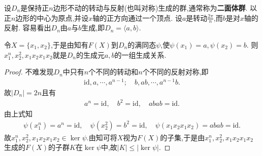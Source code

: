 \documentclass[../../main.tex]{subfiles}%
\begin{document}
\begin{proposition}
设$D_n$是保持正$n$边形不动的转动与反射(也叫对称)生成的群,通常称为\textbf{二面体群}.
以正$n$边形的中心为原点,并设$x$轴的正方向通过一个顶点. 设$a$是转动$\frac{2\pi}{n}$,而$b$是对$x$轴的反射. 容易看出$D_n$由$a$与$b$生成,即$D_n=\langle a,b\rangle.$

令$X=\{x_1,x_2\}$,于是由知有$F(X)$到$D_n$的满同态$\psi$,使$\psi(x_1)=a,\psi(x_2)=b$. 则$x_1^n,x_2^2,x_1x_2x_1x_2$就是$D_n$的生成元$a,b$的一组生成关系. 
\end{proposition}
\begin{proof}
不难发现$D_n$中只有$n$个不同的转动和$n$个不同的反射对称,即
\begin{align*}
\mathrm{id},a,\cdots ,a^{n-1};\quad b,ab,\cdots ,a^{n-1}b.
\end{align*}
故$|D_n|=2n$且有
\begin{align*}
a^n = \text{id},\quad b^2 = \text{id},\quad abab = \text{id}.
\end{align*}
由上式知
\begin{align*}
\psi \left( x_{1}^{n} \right) =a^n=\mathrm{id},\quad \psi \left( x_{2}^{2} \right) =b^2=\mathrm{id},\quad \psi \left( x_1x_2x_1x_2 \right)=abab=\mathrm{id}.
\end{align*}
故$x_1^n,x_2^2,x_1x_2x_1x_2\in \ker\psi$.由知可将$X$视为$F(X)$的子集,于是由$x_1^n,x_2^2,x_1x_2x_1x_2$生成的$F(X)$的子群$K$在$\ker \psi$中,故$|K|\leqslant |\ker\psi|.$


\end{proof}
\end{document}
